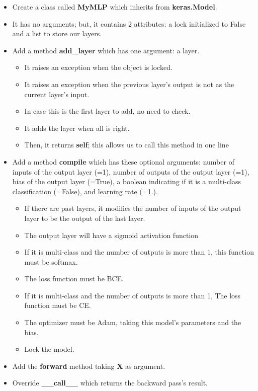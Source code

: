 \documentclass[11pt, a4paper]{article}
\begin{document}
\begin{multicols}{2}
	\begin{itemize}  
		\item Create a class called \textbf{MyMLP} which inherits from \textbf{keras.Model}.
		\item It has no arguments; but, it contains 2 attributes: a lock initialized to False and a list to store our layers. 
		\item Add a method \textbf{add\_layer} which has one argument: a layer. 
		\begin{itemize} 
			\item It raises an exception when the object is locked.
			\item It raises an exception when the previous layer's output is not as the current layer's input.
			\item In case this is the first layer to add, no need to check.
			\item It adds the layer when all is right.
			\item Then, it returns \textbf{self}; this allows us to call this method in one line 
		\end{itemize}
		\item Add a method \textbf{compile} which has these optional arguments: number of inputs of the output layer (=1), number of outputs of the output layer (=1), bias of the output layer (=True), a boolean indicating if it is a multi-class classification (=False), and learning rate (=1.).
		\begin{itemize} 
			\item If there are past layers, it modifies the number of inputs of the output layer to be the output of the last layer.
			\item The output layer will have a sigmoid activation function
			\item If it is multi-class and the number of outputs is more than 1, this function must be softmax.
			\item The loss function must be BCE.
			\item If it is multi-class and the number of outputs is more than 1, The loss function must be CE.
			\item The optimizer must be Adam, taking this model's parameters and the bias.
			\item Lock the model.
		\end{itemize}
		\item Add the \textbf{forward} method taking \textbf{X} as argument.
		\item Override \textbf{\_\_call\_\_} which returns the backward pass's result.
	\end{itemize}
	

\end{multicols}
\end{document}
